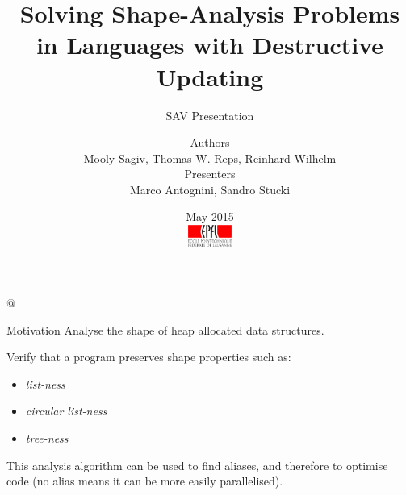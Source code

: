 \documentclass[xcolor={usenames,dvipsnames}]{beamer}
\title{Solving Shape-Analysis Problems in Languages with Destructive Updating}
\subtitle{SAV Presentation}
\author[Sagiv~et~al.]{%
  {\small Authors}\\ \vspace{1ex}
  Mooly Sagiv, Thomas W. Reps, Reinhard Wilhelm \\
  \vspace{1em}
  {\small Presenters}\\ \vspace{1ex}
  Marco Antognini, Sandro Stucki
}
\date{%
  \vspace{-1em}
  \small May 2015\\[2em]
  \includegraphics[height=7mm]{img/epfl-logo}}
\renewcommand{\emph}[1]{\alert{#1}}
\begin{document}
\begin{frame}
  \titlepage
\end{frame}

\lstMakeShortInline[%
  style=scala-color,%
  flexiblecolumns=false,%
  mathescape=false,%
  basicstyle=\color{blue!30!darkgray}\tt]@




\begin{frame}[fragile]{Motivation}
  Analyse the shape of heap allocated data structures.

  \vspace{1em}

  Verify that a program preserves shape properties such as:
  \begin{itemize}
  \item \textit{list-ness}
  \item \textit{circular list-ness}
  \item \textit{tree-ness}
  \end{itemize}

  \vspace{1em}

  This analysis algorithm can be used to find \emph{aliases}, and therefore to optimise code (no alias means it can be more easily parallelised).
\end{frame}

\newcommand{\stmtmini}[1]{%
  \node[draw, minimum width=5em, minimum height=1.25em, inner sep=1.5pt] (#1)
  {\lstinline[basicstyle=\tiny\ttfamily]@#1@};}

\newcommand{\stmt}[2]{%
  \node{$v_{#1}$}; \&
  \node[draw, minimum width=14em, minimum height=1.25em, inner sep=1.5pt] (v#1)
  {\lstinline[basicstyle=\tiny\ttfamily]@#2@};}
  
\end{document}

